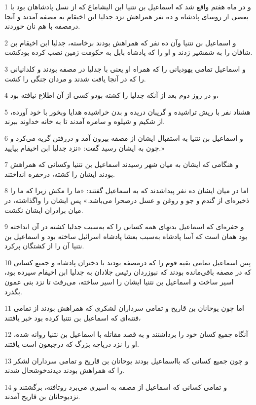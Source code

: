 \par 1 و در ماه هفتم واقع شد که اسماعیل بن نتنیا ابن الیشاماع که از نسل پادشاهان بود با بعضی از روسای پادشاه و ده نفر همراهش نزد جدلیا ابن اخیقام به مصفه آمدند و آنجا درمصفه با هم نان خوردند.
\par 2 و اسماعیل بن نتنیا وآن ده نفر که همراهش بودند برخاسته، جدلیا ابن اخیقام بن شافان را به شمشیر زدند و او را که پادشاه بابل به حکومت زمین نصب کرده بودکشت.
\par 3 و اسماعیل تمامی یهودیانی را که همراه او یعنی با جدلیا در مصفه بودند و کلدانیانی را که در آنجا یافت شدند و مردان جنگی را کشت.
\par 4 و در روز دوم بعد از آنکه جدلیا را کشته بودو کسی از آن اطلاع نیافته بود،
\par 5 هشتاد نفر با ریش تراشیده و گریبان دریده و بدن خراشیده هدایا وبخور با خود آورده، از شکیم و شیلوه و سامره آمدند تا به خانه خداوند ببرند.
\par 6 و اسماعیل بن نتنیا به استقبال ایشان از مصفه بیرون آمد و دررفتن گریه می‌کرد و چون به ایشان رسید گفت: «نزد جدلیا ابن اخیقام بیایید.»
\par 7 و هنگامی که ایشان به میان شهر رسیدند اسماعیل بن نتنیا وکسانی که همراهش بودند ایشان را کشته، درحفره انداختند.
\par 8 اما در میان ایشان ده نفر پیداشدند که به اسماعیل گفتند: «ما را مکش زیرا که ما را ذخیره‌ای از گندم و جو و روغن و عسل درصحرا می‌باشد.» پس ایشان را واگذاشته، در میان برادران ایشان نکشت.
\par 9 و حفره‌ای که اسماعیل بدنهای همه کسانی را که به‌سبب جدلیا کشته در آن انداخته بود همان است که آسا پادشاه به‌سبب بعشا پادشاه اسرائیل ساخته بود و اسماعیل بن نتنیا آن را از کشتگان پرکرد.
\par 10 پس اسماعیل تمامی بقیه قوم را که درمصفه بودند با دختران پادشاه و جمیع کسانی که در مصفه باقی‌مانده بودند که نبوزردان رئیس جلادان به جدلیا ابن اخیقام سپرده بود، اسیر ساخت و اسماعیل بن نتنیا ایشان را اسیر ساخته، می‌رفت تا نزد بنی عمون بگذرد.
\par 11 اما چون یوحانان بن قاریح و تمامی سرداران لشکری که همراهش بودند از تمامی فتنه‌ای که اسماعیل بن نتنیا کرده بود خبر یافتند،
\par 12 آنگاه جمیع کسان خود را برداشتند و به قصد مقاتله با اسماعیل بن نتنیا روانه شده، او را نزد دریاچه بزرگ که درجبعون است یافتند.
\par 13 و چون جمیع کسانی که بااسماعیل بودند یوحانان بن قاریح و تمامی سرداران لشکر را که همراهش بودند دیدندخوشحال شدند.
\par 14 و تمامی کسانی که اسماعیل از مصفه به اسیری می‌برد روتافته، برگشتند و نزدیوحانان بن قاریح آمدند.
